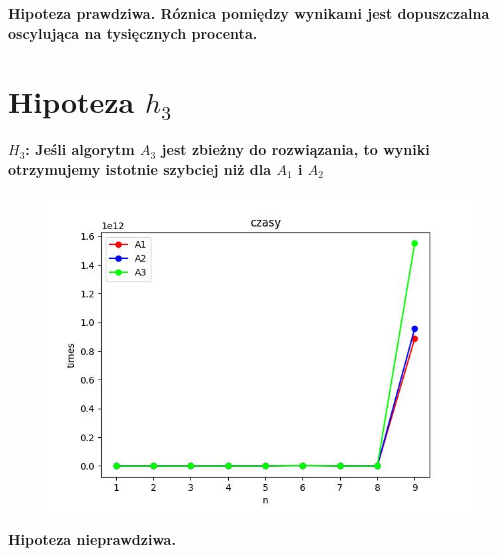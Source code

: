 \documentclass{article}
\begin{document}
\textbf{Hipoteza prawdziwa. Róznica pomiędzy wynikami jest  dopuszczalna oscylująca na tysięcznych procenta.} 


\clearpage

\section{Hipoteza $h_3$}

\textbf{$H_3$: Jeśli algorytm $A_3$ jest zbieżny do rozwiązania, to wyniki otrzymujemy istotnie szybciej niż dla $A_1$ i $A_2$}

\begin{figure}[ht!]
    \centering
    \includegraphics[width=1\linewidth]{czasy.jpg}
    \label{fig:enter-label}
\end{figure}



\textbf{Hipoteza nieprawdziwa.} 
\end{document}

